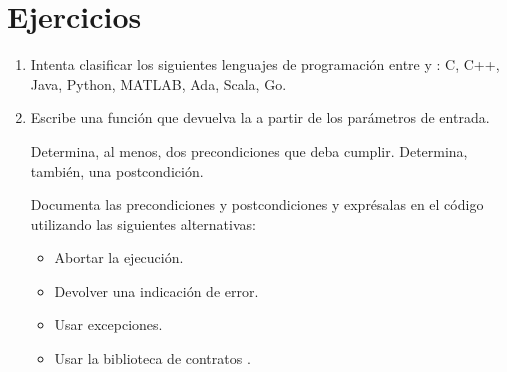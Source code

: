 \section{Ejercicios}

\begin{enumerate}

\item Intenta clasificar los siguientes lenguajes de programación entre 
       y :
      C, C++, Java, Python, MATLAB, Ada, Scala, Go.

\item Escribe una función  que devuelva la 
      a partir de los parámetros de entrada.

      Determina, al menos, dos precondiciones que deba cumplir.
      Determina, también, una postcondición.

      Documenta las precondiciones y postcondiciones y exprésalas en el código 
      utilizando las siguientes alternativas:
      \begin{itemize}
        \item Abortar la ejecución.
        \item Devolver una indicación de error.
        \item Usar excepciones.
        \item Usar la biblioteca de contratos .
      \end{itemize}

\end{enumerate}
